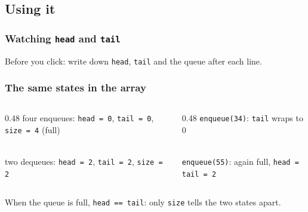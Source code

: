 \documentclass[aspectratio=169,10pt,compress]{beamer}
\begin{document}
\subsection[Use]{Using it}




\begin{frame}[t,fragile] \frametitle{Watching \texttt{head} and \texttt{tail}}
  \small Before you click: write down \texttt{head}, \texttt{tail} and the queue after each line.
\end{frame}




\begin{frame}[t,fragile] \frametitle{The same states in the array}
  \begin{columns}[T]
    \begin{column}{0.48\textwidth}
      \small four enqueues: \texttt{head = 0}, \texttt{tail = 0}, \texttt{size = 4} (full)\\
      \\[0.35em]
      two dequeues: \texttt{head = 2}, \texttt{tail = 2}, \texttt{size = 2}\\
    \end{column}
    \begin{column}{0.48\textwidth}
      \small \texttt{enqueue(34)}: \texttt{tail} wraps to 0\\
      \\[0.35em]
      \texttt{enqueue(55)}: again full, \texttt{head = tail = 2}\\
    \end{column}
  \end{columns}
  \vspace{0.3em}
  \small When the queue is full, \texttt{head == tail}: only \texttt{size} tells the two states apart.
\end{frame}
\end{document}
